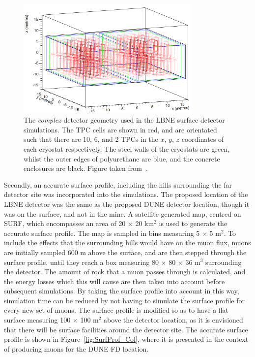 \begin{figure}
  \centering
  \includegraphics[width=0.8\textwidth]{ComplexGeom}
  \caption[The \emph{complex} detector geometry used in the LBNE surface detector simulations]
          {The \emph{complex} detector geometry used in the LBNE surface detector simulations. The TPC cells are shown in red, and are orientated such that there are 10, 6, and 2 TPCs in the $x$, $y$, $z$ coordinates of each cryostat respectively. The steel walls of the cryostats are green, whilst the outer edges of polyurethane are blue, and the concrete enclosures are black. Figure taken from~\citep{MartinsThesis}.}
  \label{fig:SurfCompGeom}
\end{figure}

Secondly, an accurate surface profile, including the hills surrounding the far detector site was incorporated into the simulations. The proposed location of the LBNE detector was the same as the proposed DUNE detector location, though it was on the surface, and not in the mine. A satellite generated map, centred on SURF, which encompasses an area of 20 $\times$ 20 km$^2$ is used to generate the accurate surface profile. The map is sampled in bins measuring 5 $\times$ 5 m$^2$. To include the effects that the surrounding hills would have on the muon flux, muons are initially sampled 600 m above the surface, and are then stepped through the surface profile, until they reach a box measuring 80 $\times$ 80 $\times$ 36 m$^3$ surrounding the detector. The amount of rock that a muon passes through is calculated, and the energy losses which this will cause are then taken into account before subsequent simulations. By taking the surface profile into account in this way, simulation time can be reduced by not having to simulate the surface profile for every new set of muons. The surface profile is modified so as to have a flat surface measuring 100 $\times$ 100 m$^2$ above the detector location, as it is envisioned that there will be surface facilities around the detector site. The accurate surface profile is shown in Figure~\ref{fig:SurfProf_Col}, where it is presented in the context of producing muons for the DUNE FD location. \\

